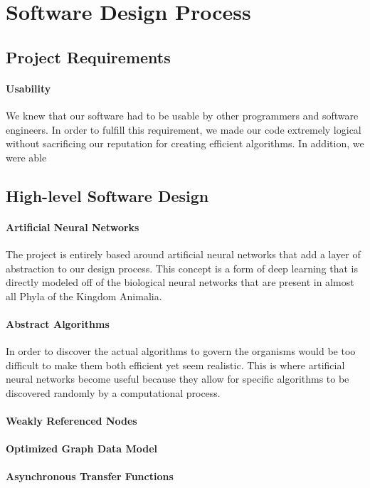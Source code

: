 \documentclass[letterpaper, 10pt]{article}
\begin{document}
	\normalsize
	
\cleardoublepage
\section{Software Design Process}
	\subsection{Project Requirements}
		\paragraph{Usability} We knew that our software had to be usable by other programmers and software engineers. In order to fulfill this requirement, we made our code extremely logical without sacrificing our reputation for creating efficient algorithms. In addition, we were able 
		
		
	\subsection{High-level Software Design}
		\paragraph{Artificial Neural Networks}
		The project is entirely based around artificial neural networks that add a layer of abstraction to our design process. This concept is a form of deep learning that is directly modeled off of the biological neural networks that are present in almost all Phyla of the Kingdom Animalia.
		\paragraph{Abstract Algorithms}
		In order to discover the actual algorithms to govern the organisms would be too difficult to make them both efficient yet seem realistic. This is where artificial neural networks become useful because they allow for specific algorithms to be discovered randomly by a computational process.
		\paragraph{Weakly Referenced Nodes}
		\paragraph{Optimized Graph Data Model}
		\paragraph{Asynchronous Transfer Functions}
\end{document}
